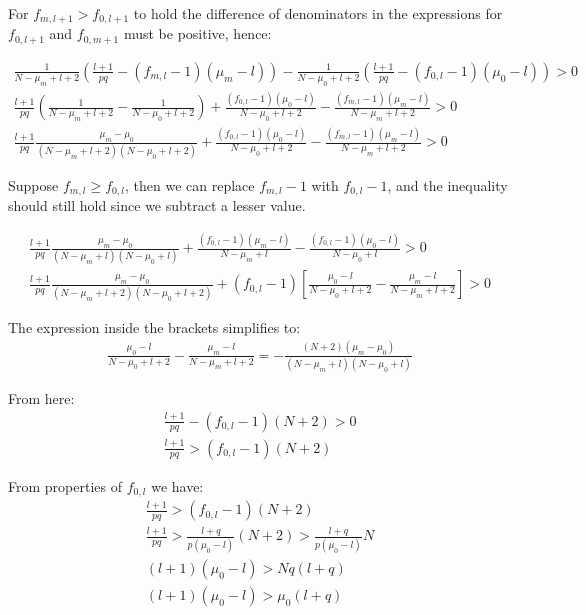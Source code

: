 \documentclass[11pt,draft]{article}
\begin{document}
For  $f_{m,{l+1}}  > f_{0,{l+1}}$  to hold the difference of denominators in the expressions for  $f_{0,l+1}$  and  $f_{0,m+1}$ must be positive, hence:

\begin{align}
\frac{1}{N-\mu_m + l+2} \left (\frac{l+1}{pq} - (f_{m,l} - 1)(\mu_m - l) \right ) -  \frac{1}{N-\mu_0 + l+2} \left (\frac{l+1}{pq} - (f_{0,l} - 1)(\mu_0 - l) \right) > 0\\
\frac{l+1}{pq} (\frac{1}{N-\mu_m + l + 2}  - \frac{1}{N-\mu_0 + l + 2} ) + \frac{(f_{0,l} - 1)(\mu_0 - l)}{N-\mu_0 + l+2} - \frac{(f_{m,l} - 1)(\mu_m - l)}{N-\mu_m + l+2} > 0 \\
 \frac{l+1}{pq} \frac{\mu_m - \mu_0}{(N-\mu_m + l+2)(N-\mu_0 + l+2)} + \frac{(f_{0,l} - 1)(\mu_0 - l)}{N-\mu_0 + l+2} - \frac{(f_{m,l} - 1)(\mu_m - l)}{N-\mu_m + l+2} > 0
\end{align}

Suppose $f_{m,l} \ge f_{0,l}$, then we can replace $f_{m,l} - 1$ with $f_{0,l} - 1$, and the inequality should still hold since we subtract a lesser value.

\begin{align}
\frac{l+1}{pq} \frac{\mu_m - \mu_0}{(N-\mu_m + l)(N-\mu_0 + l)}  + \frac{(f_{0,l} - 1)(\mu_m - l)}{N-\mu_m + l}  - \frac{(f_{0,l} - 1)(\mu_0 - l)}{N-\mu_0 + l} > 0\\
\frac{l+1}{pq} \frac{\mu_m - \mu_0}{(N-\mu_m + l+2)(N-\mu_0 + l+2)}  + (f_{0,l} - 1) \left [ \frac{\mu_0 - l}{N-\mu_0 + l+2}  - \frac{\mu_m - l}{N-\mu_m + l+2} \right ]  > 0
\end{align}

The expression inside the brackets simplifies to:
\begin{align}
\frac{\mu_0 - l}{N-\mu_0 + l+2}  - \frac{\mu_m - l}{N-\mu_m + l+2}  = - \frac{(N+2)(\mu_m-\mu_0)}{(N-\mu_m + l)(N-\mu_0 + l)}
\end{align}

From here:
\begin{align}
\frac{l+1}{pq} - (f_{0,l} - 1)(N+2) > 0 \\
\frac{l+1}{pq} > (f_{0,l} - 1)(N+2)
\end{align}

From properties of $f_{0,l}$ we have:
\begin{align}
\frac{l+1}{pq} > (f_{0,l} - 1)(N+2) \\
\frac{l+1}{pq} > \frac{l + q}{p(\mu_0 - l)}(N+2) >   \frac{l + q}{p(\mu_0 - l)}N \\
(l+1)(\mu_0 - l) > Nq(l+q) \\
(l+1)(\mu_0 - l) > \mu_0(l+q)
\end{align}
\end{document}
